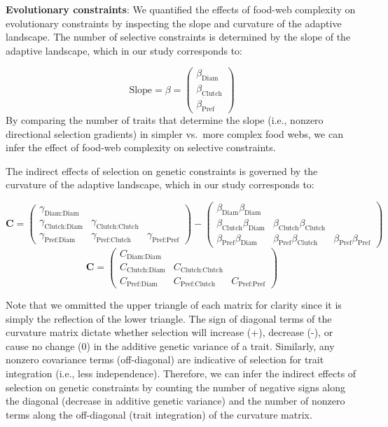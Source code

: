 \documentclass[11pt,]{article}
\begin{document}
\textbf{Evolutionary constraints}: We quantified the effects of food-web
complexity on evolutionary constraints by inspecting the slope and
curvature of the adaptive landscape. The number of selective constraints
is determined by the slope of the adaptive landscape, which in our study
corresponds to:

\[\text{Slope} = \beta = \begin{pmatrix} \beta_{\text{Diam}} \\ \beta_{\text{Clutch}} \\ \beta_{\text{Pref}} \end{pmatrix} \]
By comparing the number of traits that determine the slope (i.e.,
nonzero directional selection gradients) in simpler vs.~more complex
food webs, we can infer the effect of food-web complexity on selective
constraints.

The indirect effects of selection on genetic constraints is governed by
the curvature of the adaptive landscape, which in our study corresponds
to:

\[\textbf{C} = \begin{pmatrix} \gamma_{\text{Diam:Diam}}&& \\ \gamma_{\text{Clutch:Diam}}&\gamma_{\text{Clutch:Clutch}}& \\ \gamma_{\text{Pref:Diam}} & \gamma_{\text{Pref:Clutch}} &\gamma_{\text{Pref:Pref}} \end{pmatrix} - \begin{pmatrix} \beta_{\text{Diam}}\beta_{\text{Diam}}&& \\ \beta_{\text{Clutch}}\beta_{\text{Diam}}&\beta_{\text{Clutch}}\beta_{\text{Clutch}}& \\ \beta_{\text{Pref}}\beta_{\text{Diam}} & \beta_{\text{Pref}}\beta_{\text{Clutch}} &\beta_{\text{Pref}}\beta_{\text{Pref}} \end{pmatrix}\]
\[\textbf{C} = \begin{pmatrix} C_{\text{Diam:Diam}}&& \\ C_{\text{Clutch:Diam}} & C_{\text{Clutch:Clutch}} & \\ C_{\text{Pref:Diam}} & C_{\text{Pref:Clutch}} & C_{\text{Pref:Pref}} \end{pmatrix}\]

Note that we ommitted the upper triangle of each matrix for clarity
since it is simply the reflection of the lower triangle. The sign of
diagonal terms of the curvature matrix dictate whether selection will
increase (+), decrease (-), or cause no change (0) in the additive
genetic variance of a trait. Similarly, any nonzero covariance terms
(off-diagonal) are indicative of selection for trait integration (i.e.,
less independence). Therefore, we can infer the indirect effects of
selection on genetic constraints by counting the number of negative
signs along the diagonal (decrease in additive genetic variance) and the
number of nonzero terms along the off-diagonal (trait integration) of
the curvature matrix.
\end{document}
